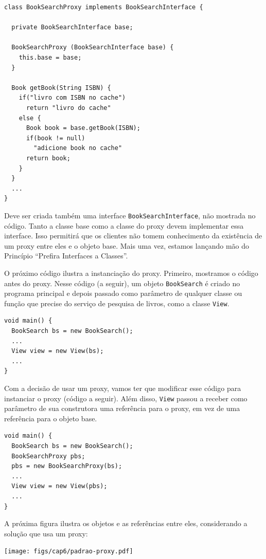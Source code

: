 \documentclass[
  11pt,
  twoside]{book}
\newcommand{\passthrough}[1]{#1}
\let\origfigure\figure
\let\endorigfigure\endfigure
\renewenvironment{figure}[1][2] {
    \expandafter\origfigure\expandafter[!h]
} {
    \endorigfigure
}
\begin{document}
\begin{lstlisting}
class BookSearchProxy implements BookSearchInterface {

  private BookSearchInterface base;

  BookSearchProxy (BookSearchInterface base) {
    this.base = base;
  }

  Book getBook(String ISBN) {
    if("livro com ISBN no cache")
      return "livro do cache"
    else {
      Book book = base.getBook(ISBN);
      if(book != null)
        "adicione book no cache"
      return book;
    }
  }
  ...
}
\end{lstlisting}

Deve ser criada também uma interface
\passthrough{\lstinline!BookSearchInterface!}, não mostrada no código.
Tanto a classe base como a classe do proxy devem implementar essa
interface. Isso permitirá que os clientes não tomem conhecimento da
existência de um proxy entre eles e o objeto base. Mais uma vez, estamos
lançando mão do Princípio ``Prefira Interfaces a Classes''.

O próximo código ilustra a instanciação do proxy. Primeiro, mostramos o
código antes do proxy. Nesse código (a seguir), um objeto
\passthrough{\lstinline!BookSearch!} é criado no programa principal e
depois passado como parâmetro de qualquer classe ou função que precise
do serviço de pesquisa de livros, como a classe
\passthrough{\lstinline!View!}.

\begin{lstlisting}
void main() {
  BookSearch bs = new BookSearch();
  ...
  View view = new View(bs);
  ...
}
\end{lstlisting}

Com a decisão de usar um proxy, vamos ter que modificar esse código para
instanciar o proxy (código a seguir). Além disso,
\passthrough{\lstinline!View!} passou a receber como parâmetro de sua
construtora uma referência para o proxy, em vez de uma referência para o
objeto base.

\begin{lstlisting}
void main() {
  BookSearch bs = new BookSearch();
  BookSearchProxy pbs;
  pbs = new BookSearchProxy(bs);
  ...
  View view = new View(pbs);
  ...
}
\end{lstlisting}

A próxima figura ilustra os objetos e as referências entre eles,
considerando a solução que usa um proxy:

\begin{figure}
\centering
\texttt{[image: figs/cap6/padrao-proxy.pdf]}
\caption{Padrão de projeto Proxy}
\end{figure}
\end{document}
